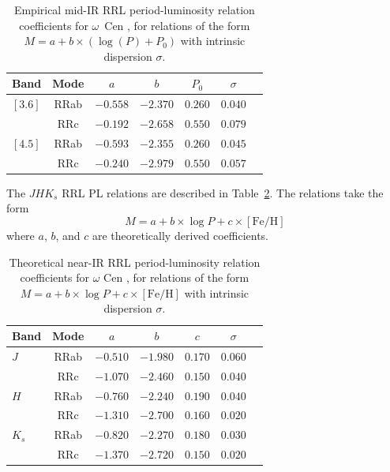 \documentclass[a4paper,fleqn,usenatbib]{mnras}
\begin{document}

\begin{table}
\centering
\caption{Empirical mid-IR RRL period-luminosity relation coefficients for $\omega$~Cen \citep{2015ApJ...808...11N}, for relations of the form $M = a + b \times (\log (P) + P_0)$ with intrinsic dispersion $\sigma$.} 
\label{tab:pl_table_m4}
\begin{tabular}{l||c|c|c|c|c|r} 
\hline \hline
Band & Mode & $a$ & $b$ & $P_0$ & $\sigma$ \\
\hline
$[3.6]$ & RRab & $-0.558$ & $-2.370$ & $0.260$ & $0.040$ \\
            & RRc & $-0.192$ & $-2.658$ & $0.550$ & $0.079$ \\
$[4.5]$ & RRab & $-0.593$ & $-2.355$ & $0.260$ & $0.045$ \\
            & RRc & $-0.240$ & $-2.979$ & $0.550$ & $0.057$ \\ 
            \hline
\end{tabular}
\end{table}

The $JHK_s$ RRL PL relations are described in Table~\ref{tab:pl_table_theo}. The relations take the form
\begin{equation}M = a + b\times\log P + c\times[\text{Fe/H}]\end{equation}
where $a$, $b$, and $c$ are theoretically derived coefficients.

\begin{table}
\centering
\caption{Theoretical near-IR RRL period-luminosity relation coefficients for $\omega$ Cen \citep{2015ApJ...808...50M}, for relations of the form $M = a + b \times \log P + c \times [\text{Fe/H}]$ with intrinsic dispersion $\sigma$.}
\label{tab:pl_table_theo}
\begin{tabular}{l||c|c|c|c|c|r} 
\hline \hline
Band & Mode & $a$   & $b$   & $c$   & $\sigma$ \\
\hline
$J$ & RRab & $-0.510$ & $-1.980$ & $0.170$ & $0.060$ \\
       & RRc & $-1.070$ & $-2.460$ & $0.150$ & $0.040$ \\
$H$ & RRab & $-0.760$ & $-2.240$ & $0.190$ & $0.040$\\
       & RRc & $-1.310$ & $-2.700$ & $0.160$ & $0.020$\\
$K_s$ & RRab & $-0.820$ & $-2.270$ & $0.180$ & $0.030$\\
           & RRc & $-1.370$ & $-2.720$ & $0.150$ & $0.020$ \\       
\hline
\end{tabular}
\end{table}
\end{document}
